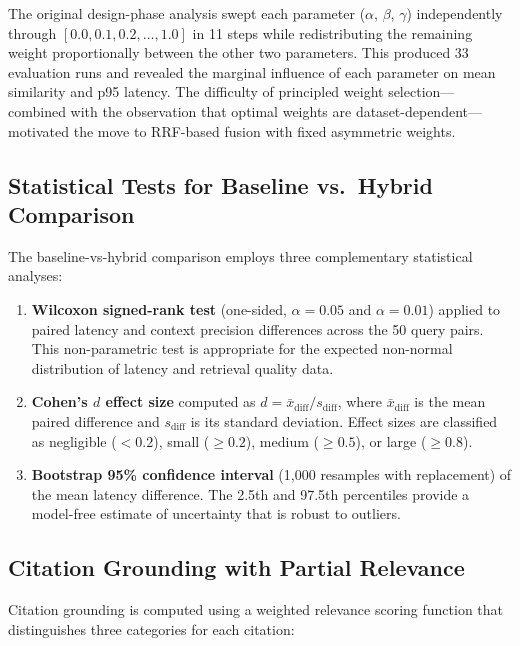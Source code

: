 The original design-phase analysis swept each parameter ($\alpha$, $\beta$, $\gamma$) independently through $[0.0, 0.1, 0.2, \ldots, 1.0]$ in 11 steps while redistributing the remaining weight proportionally between the other two parameters. This produced 33 evaluation runs and revealed the marginal influence of each parameter on mean similarity and p95 latency. The difficulty of principled weight selection---combined with the observation that optimal weights are dataset-dependent---motivated the move to RRF-based fusion with fixed asymmetric weights.

\subsection{Statistical Tests for Baseline vs.\ Hybrid Comparison}
\label{sec:stat_tests}

The baseline-vs-hybrid comparison employs three complementary statistical analyses:

\begin{enumerate}[leftmargin=0.5in]
  \item \textbf{Wilcoxon signed-rank test} (one-sided, $\alpha = 0.05$ and $\alpha = 0.01$) applied to paired latency and context precision differences across the 50 query pairs. This non-parametric test is appropriate for the expected non-normal distribution of latency and retrieval quality data.
  \item \textbf{Cohen's $d$ effect size} computed as $d = \bar{x}_{\text{diff}} / s_{\text{diff}}$, where $\bar{x}_{\text{diff}}$ is the mean paired difference and $s_{\text{diff}}$ is its standard deviation. Effect sizes are classified as negligible ($< 0.2$), small ($\geq 0.2$), medium ($\geq 0.5$), or large ($\geq 0.8$).
  \item \textbf{Bootstrap 95\% confidence interval} (1{,}000 resamples with replacement) of the mean latency difference. The 2.5th and 97.5th percentiles provide a model-free estimate of uncertainty that is robust to outliers.
\end{enumerate}

\subsection{Citation Grounding with Partial Relevance}
\label{sec:partial_relevance}

Citation grounding is computed using a weighted relevance scoring function that distinguishes three categories for each citation:

